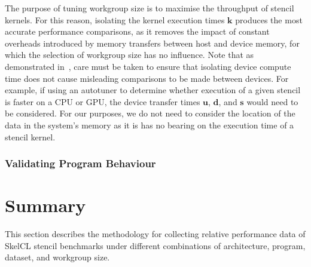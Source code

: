 The purpose of tuning workgroup size is to maximise the throughput of
stencil kernels. For this reason, isolating the kernel execution times
$\bm{k}$ produces the most accurate performance comparisons, as it
removes the impact of constant overheads introduced by memory
transfers between host and device memory, for which the selection of
workgroup size has no influence. Note that as demonstrated
in~\cite{Gregg2011}, care must be taken to ensure that isolating
device compute time does not cause misleading comparisons to be made
between devices. For example, if using an autotuner to determine
whether execution of a given stencil is faster on a CPU or GPU, the
device transfer times $\bm{u}$, $\bm{d}$, and $\bm{s}$ would need to
be considered. For our purposes, we do not need to consider the
location of the data in the system's memory as it is has no bearing on
the execution time of a stencil kernel.


\subsubsection{Validating Program Behaviour}



\section{Summary}

This section describes the methodology for collecting relative
performance data of SkelCL stencil benchmarks under different
combinations of architecture, program, dataset, and workgroup size.
